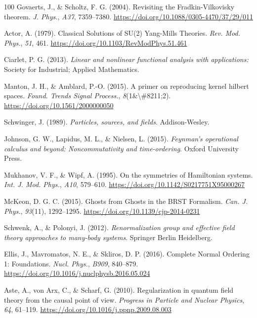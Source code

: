 \documentclass[11pt]{book}
\begin{document}
\begin{thebibliography}{100}
 Govaerts, J., \& Scholtz, F. G. (2004). Revisiting the
Fradkin-Vilkovisky theorem. \emph{J. Phys.}, \emph{A37}, 7359--7380.
\url{https://doi.org/10.1088/0305-4470/37/29/011}

 Actor, A. (1979). Classical Solutions of SU(2) Yang-Mills Theories.
\emph{Rev. Mod. Phys.}, \emph{51}, 461.
\url{https://doi.org/10.1103/RevModPhys.51.461}

 Ciarlet, P. G. (2013). \emph{Linear and nonlinear functional analysis
with applications:} Society for Industrial; Applied Mathematics.

 Manton, J. H., \& Amblard, P.-O. (2015). A primer on reproducing kernel
hilbert spaces. \emph{Found. Trends Signal Process.},
\emph{8}(1\&\textbackslash\#8211;2).
\url{https://doi.org/10.1561/2000000050}

 Schwinger, J. (1989). \emph{Particles, sources, and fields}.
Addison-Wesley.

 Johnson, G. W., Lapidus, M. L., \& Nielsen, L. (2015). \emph{Feynman's
operational calculus and beyond: Noncommutativity and time-ordering}.
Oxford University Press.

 Mukhanov, V. F., \& Wipf, A. (1995). On the symmetries of Hamiltonian
systems. \emph{Int. J. Mod. Phys.}, \emph{A10}, 579--610.
\url{https://doi.org/10.1142/S0217751X95000267}

 McKeon, D. G. C. (2015). Ghosts from Ghosts in the BRST Formalism.
\emph{Can. J. Phys.}, \emph{93}(11), 1292--1295.
\url{https://doi.org/10.1139/cjp-2014-0231}

 Schwenk, A., \& Polonyi, J. (2012). \emph{Renormalization group and
effective field theory approaches to many-body systems}. Springer Berlin
Heidelberg.

 Ellis, J., Mavromatos, N. E., \& Skliros, D. P. (2016). Complete Normal
Ordering 1: Foundations. \emph{Nucl. Phys.}, \emph{B909}, 840--879.
\url{https://doi.org/10.1016/j.nuclphysb.2016.05.024}

 Aste, A., von Arx, C., \& Scharf, G. (2010). Regularization in quantum
field theory from the causal point of view. \emph{Progress in Particle
and Nuclear Physics}, \emph{64}, 61--119.
\url{https://doi.org/10.1016/j.ppnp.2009.08.003}


\end{thebibliography}
\end{document}
